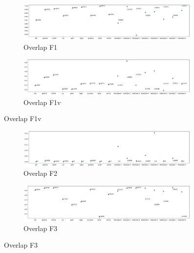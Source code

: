 \begin{figure}[h!]
    \centering
    \begin{subfigure}{0.496\textwidth}
        \includegraphics[width=0.99\textwidth]{figures/overlap-F1.png}
        \caption{Overlap F1}
        \label{fig:overlap-f1}
    \end{subfigure}
    \begin{subfigure}{0.496\textwidth}
        \includegraphics[width=0.99\textwidth]{figures/overlap-F1v.png}
        \caption{Overlap F1v}
        \label{fig:overlap-f1v}
    \end{subfigure}
\end{figure}
\begin{figure}[h!]\ContinuedFloat
    \centering
    \begin{subfigure}{0.496\textwidth}
        \includegraphics[width=0.99\textwidth]{figures/overlap-F2.png}
        \caption{Overlap F2}
        \label{fig:overlap-f2}
    \end{subfigure}
    \begin{subfigure}{0.496\textwidth}
        \includegraphics[width=0.99\textwidth]{figures/overlap-F3.png}
        \caption{Overlap F3}
        \label{fig:overlap-f3}
    \end{subfigure}
\end{figure}

